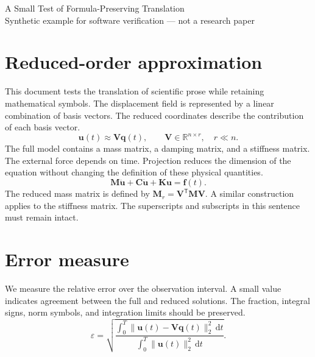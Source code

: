 \documentclass[11pt,a4paper]{article}
\begin{document}
\begin{center}
{\Large A Small Test of Formula-Preserving Translation}\\[6pt]
Synthetic example for software verification --- not a research paper
\end{center}
\section{Reduced-order approximation}
This document tests the translation of scientific prose while retaining mathematical symbols. The displacement field is represented by a linear combination of basis vectors. The reduced coordinates describe the contribution of each basis vector.
\begin{equation}
\mathbf{u}(t) \approx \mathbf{V}\mathbf{q}(t), \qquad
\mathbf{V}\in\mathbb{R}^{n\times r},\quad r\ll n.
\end{equation}
The full model contains a mass matrix, a damping matrix, and a stiffness matrix. The external force depends on time. Projection reduces the dimension of the equation without changing the definition of these physical quantities.
\begin{equation}
\mathbf{M}\ddot{\mathbf{u}} + \mathbf{C}\dot{\mathbf{u}} + \mathbf{K}\mathbf{u} = \mathbf{f}(t).
\end{equation}
The reduced mass matrix is defined by $\mathbf{M}_r=\mathbf{V}^{\mathsf{T}}\mathbf{M}\mathbf{V}$. A similar construction applies to the stiffness matrix. The superscripts and subscripts in this sentence must remain intact.
\section{Error measure}
We measure the relative error over the observation interval. A small value indicates agreement between the full and reduced solutions. The fraction, integral signs, norm symbols, and integration limits should be preserved.
\begin{equation}
\varepsilon = \sqrt{\frac{\int_0^T \|\mathbf{u}(t)-\mathbf{V}\mathbf{q}(t)\|_2^2\,\mathrm{d}t}
{\int_0^T \|\mathbf{u}(t)\|_2^2\,\mathrm{d}t}}.
\end{equation}
\newpage
\end{document}
